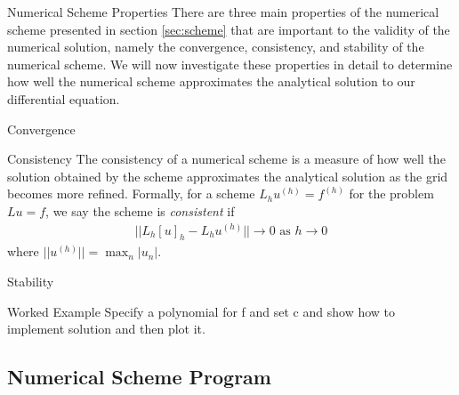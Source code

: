 \documentclass{article}
\begin{document}
\begin{section}{Numerical Scheme Properties}\label{sec:scheme_prop}
  There are three main properties of the numerical scheme presented in section
  \ref{sec:scheme} that are important to the validity of the numerical solution,
  namely the convergence, consistency, and stability of the numerical scheme.
  We will now investigate these properties in detail to determine how well
  the numerical scheme approximates the analytical solution to our differential
  equation.

  \begin{subsection}{Convergence}
  \end{subsection}

  \begin{subsection}{Consistency}
    The consistency of a numerical scheme is a measure of how well the solution
    obtained by the scheme approximates the analytical solution as the grid
    becomes more refined. Formally, for a scheme $L_h u^{(h)} = f^{(h)}$ for the
    problem $Lu = f$, we say the scheme is \textit{consistent} if
    \begin{align}\label{consistency}
      ||L_h[u]_h - L_h u^{(h)}|| \to 0 \text{\ as $h \to 0$}
    \end{align}
    where $|| u^{(h)} || = \max_n |u_n|$.
  \end{subsection}

  \begin{subsection}{Stability}
  \end{subsection}

\end{section}


\begin{section}{Worked Example}
  Specify a polynomial for f and set c and show how to implement solution and
  then plot it.
\end{section}


\newpage
\begin{appendices}
  \section{Numerical Scheme Program}
\end{appendices}
\end{document}
